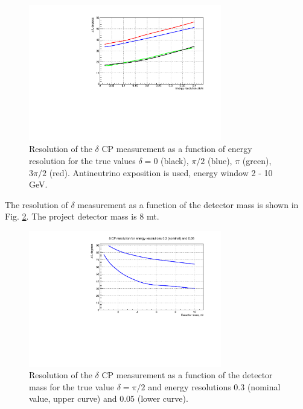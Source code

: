 \documentclass[prd,showpacs,groupedaddress,superscriptaddress,amsmath,amssymb]{revtex4-2} %
\begin{document}
\begin{figure}[h]
\begin{center}
\includegraphics[width=0.75\textwidth]{del_delres_eres_anu.pdf}
\caption {Resolution of the $\delta$ CP measurement as a function of energy resolution for the true values $\delta = 0$ (black), $\pi/2$ (blue),
$\pi$ (green), $3\pi/2$ (red). Antineutrino exposition is used, energy window 2 - 10 GeV.
\label{fig:del_delres_eres_anu}}
\end{center}
\end{figure}

 The resolution of $\delta$ measurement as a function of the detector mass is shown in Fig. \ref{fig:del_delres_mdet}. The project detector mass is 8 mt.

\begin{figure}[h]
\begin{center}
\includegraphics[width=0.75\textwidth]{del_delres_mdet.pdf}
\caption {Resolution of the $\delta$ CP measurement as a function of the detector mass for the true value $\delta = \pi/2$
and energy resolutions 0.3 (nominal value, upper curve) and 0.05 (lower curve).
\label{fig:del_delres_mdet}}
\end{center}  
\end{figure}
\end{document}
